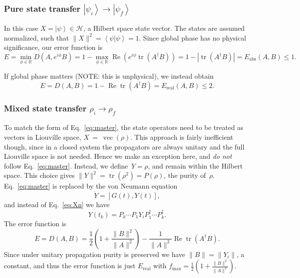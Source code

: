 \documentclass[aps, pra, a4paper, longbibliography, superscriptaddress]{revtex4-1}
\newcommand{\be}{\begin{equation}}
\newcommand{\ee}{\end{equation}}
\newcommand{\R}{{\mathbb R}}  %
\newcommand{\ket}[1]{\left| #1 \right \rangle}
\newcommand{\braket}[2]{\left \langle #1 | #2 \right \rangle}
\newcommand{\ketbra}[2]{\left| #1 \right \rangle \left \langle #2 \right|}
\newcommand{\comm}[2]{\left[ #1, #2 \right]}
\newcommand{\hilb}[1]{\mathcal{#1}}
\DeclareMathOperator{\tr}{tr}
\DeclareMathOperator{\re}{Re}
\DeclareMathOperator{\cvec}{vec}
\begin{document}
\subsubsection{Pure state transfer $\ket{\psi_i} \to \ket{\psi_f}$}
\label{sec:closed-pure}

In this case $X = \ket{\psi} \in \hilb{H}$, a Hilbert space state vector.
The states are assumed normalized, such that $\|X\|^2 = \braket{\psi}{\psi} = 1$.
Since global phase has no physical significance, our error function is
\be
E = \min_{\phi \in \R} D(A, e^{i \phi} B)
= 1 -\max_{\phi \in \R} \re \left( e^{i \phi} \tr(A^\dagger B)\right)
= 1 -|\tr(A^\dagger B)|
= E_\text{abs}(A, B) \le 1.
\ee

\begin{comment}
This result can also be obtained using the mixed state formula in the
vec representation, with $\rho = \ketbra{\psi}{\psi}$ and thus
$X = \cvec(\rho) = \ket{\psi^*} \otimes \ket{\psi}$.
The fidelity diagram breaks into two pieces and
we obtain
\be
f(A, B)
= (\re) \left|(\tr)(A^\dagger  B) \right|^2.
\ee
with $0 \le f(A, B) \le 1$.
Thus the problem simplifies back into Hilbert space
(albeit with an extra absolute value squared in the expression for the fidelity), and we may equivalently
choose $X = \ket{\psi}$.
\end{comment}


If global phase matters (NOTE: this is unphysical), we instead obtain
\be
E
= D(A, B)
= 1 -\re \tr(A^\dagger B)
= E_\text{real}(A, B) \le 2.
\ee



\subsubsection{Mixed state transfer $\rho_i \to \rho_f$}
\label{sec:closed-mixed}

To match the form of Eq.~\eqref{eq:master},
the state operators need to be treated as vectors in Liouville space,
$X~=~\cvec(\rho)$.
This approach is fairly inefficient though, since in a closed system the
propagators are always unitary and the full Liouville space is not
needed. Hence we make an exception here, and \emph{do not} follow Eq.~\eqref{eq:master}.
Instead, we define~$Y = \rho$, and remain within the Hilbert space.
This choice gives $\|Y\|^2 = \tr(\rho^2) = P(\rho)$, the purity of~$\rho$.
Eq.~\eqref{eq:master} is replaced by the von Neumann equation
\be
\label{eq:vonneumann}
\dot{Y} = \comm{G(t)}{Y(t)},
\ee
and instead of Eq.~\eqref{eq:Xn} we have
\be
Y(t_k) = P_k \cdots P_1 Y_i P_1^\dagger \cdots P_k^\dagger.
\ee
The error function is
\be
E
= D(A, B)
= \frac{1}{2}\left(1 +\frac{\|B\|^2}{\|A\|^2}\right) -\frac{1}{\|A\|^2} \re \tr(A^\dagger B).
\ee
Since under unitary propagation purity is preserved we have
$\|B\| = \|Y_i\|$, a constant, and thus the error function is just $E_\text{real}$ with
$f_{\text{max}} = \frac{1}{2}\left(1 +\frac{\|B\|^2}{\|A\|^2}\right)$.
\end{document}
